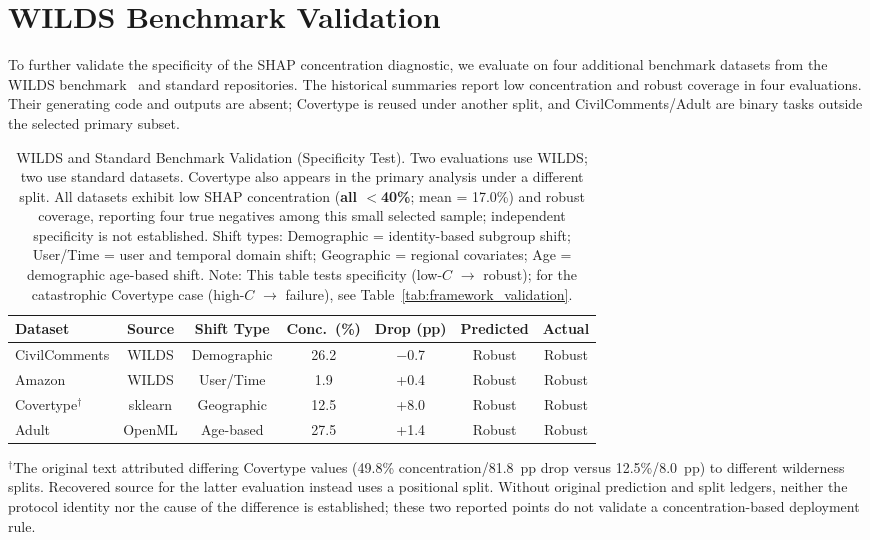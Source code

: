 \documentclass[accepted]{uai2026} %
\begin{document}
\section{WILDS Benchmark Validation}\label{app:wilds}

To further validate the specificity of the SHAP concentration diagnostic, we evaluate on four additional benchmark datasets from the WILDS benchmark~\citep{koh2021wilds} and standard repositories. The historical summaries report low concentration and robust coverage in four evaluations. Their generating code and outputs are absent; Covertype is reused under another split, and CivilComments/Adult are binary tasks outside the selected primary subset.

\begin{table}[htbp]
\centering
\caption{WILDS and Standard Benchmark Validation (Specificity Test). Two evaluations use WILDS; two use standard datasets. Covertype also appears in the primary analysis under a different split. All datasets exhibit low SHAP concentration (\textbf{all $<$40\%}; mean = 17.0\%) and robust coverage, reporting four true negatives among this small selected sample; independent specificity is not established. Shift types: Demographic = identity-based subgroup shift; User/Time = user and temporal domain shift; Geographic = regional covariates; Age = demographic age-based shift. Note: This table tests specificity (low-$C$ $\rightarrow$ robust); for the catastrophic Covertype case (high-$C$ $\rightarrow$ failure), see Table~\ref{tab:framework_validation}.}\label{tab:wilds_validation}
\small
\begin{tabular}{@{}lcccccc@{}}
\toprule
Dataset & Source & Shift Type & Conc.\ (\%) & Drop (pp) & Predicted & Actual \\
\midrule
CivilComments & WILDS & Demographic & 26.2 & $-$0.7 & Robust & Robust \\
Amazon & WILDS & User/Time & 1.9 & +0.4 & Robust & Robust \\
Covertype$^\dagger$ & sklearn & Geographic & 12.5 & +8.0 & Robust & Robust \\
Adult & OpenML & Age-based & 27.5 & +1.4 & Robust & Robust \\
\bottomrule
\end{tabular}

\raggedright
\footnotesize
$^\dagger$The original text attributed differing Covertype values (49.8\% concentration/81.8~pp drop versus 12.5\%/8.0~pp) to different wilderness splits. Recovered source for the latter evaluation instead uses a positional split. Without original prediction and split ledgers, neither the protocol identity nor the cause of the difference is established; these two reported points do not validate a concentration-based deployment rule.
\end{table}
\end{document}
